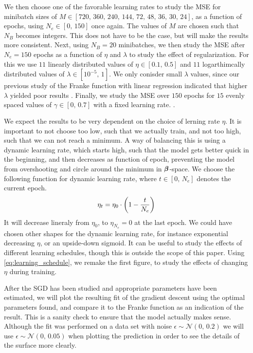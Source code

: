 \documentclass[12pt]{extarticle}
\begin{document}
We then choose one of the favorable learning rates to study the MSE for minibatch sizes of $M\in[720,\,360,\,240,\,144,\,72,\,48,\,36,\,30,\,24]$, as a function of epochs, using $N_e\in[0,\,150]$ once again. The values of $M$ are chosen such that $N_B$ becomes integers. This does not have to be the case, but will make the results more consistent. Next, using $N_B=20$ minibatches, we then study the MSE after $N_e=150$ epochs as a function of $\eta$ and $\lambda$ to study the effect of regularization. For this we use $11$ linearly distributed values of $\eta\in[0.1,\,0.5]$ and $11$ logarthimcally distributed values of $\lambda\in[10^{-5},\,1]$. We only conisder small $\lambda$ values, since our previous study of the Franke function with linear regression indicated that higher $\lambda$ yielded poor results \cite{project1}. Finally, we study the MSE over $150$ epochs for $15$ evenly spaced values of $\gamma\in[0,\,0.7]$ with a fixed learning rate.
.

We expect the results to be very dependent on the choice of lerning rate $\eta$. It is important to not choose too low, such that we actually train, and not too high, such that we can not reach a minimum. A way of balancing this is using a dynamic learning rate, which starts high, such that the model gets better quick in the beginning, and then decreases as function of epoch, preventing the model from overshooting and circle around the minimum in $\boldsymbol{\beta}$-space. We choose the following function for dynamic learning rate, where $t\in[0, \, N_e]$ denotes the current epoch.
\begin{align} \label{eq:learning_schedule}
	\eta_t = \eta_0 \cdot \left( 1 - \frac{t}{N_e} \right)
\end{align}
It will decrease lineraly from $\eta_0$, to $\eta_{N_e}=0$ at the last epoch.  We could have chosen other shapes for the dynamic learning rate, for instance exponential decreasing $\eta$, or an upside-down sigmoid. It can be useful to study the effects of different learning schedules, though this is outside the scope of this paper.
Using \eqref{eq:learning_schedule}, we remake the first figure, to study the effects of changing $\eta$ during training.

After the SGD has been studied and appropriate parameters have been estimated, we will plot the resulting fit of the gradient descent using the optimal parameters found, and compare it to the Franke function as an indication of the result. This is a sanity check to ensure that the model actually makes sense. Although the fit was performed on a data set with noise $\epsilon\sim\mathcal{N}(0,\,0.2)$ we will use $\epsilon\sim\mathcal{N}(0,\,0.05)$ when plotting the prediction in order to see the details of the surface more clearly.
\end{document}
